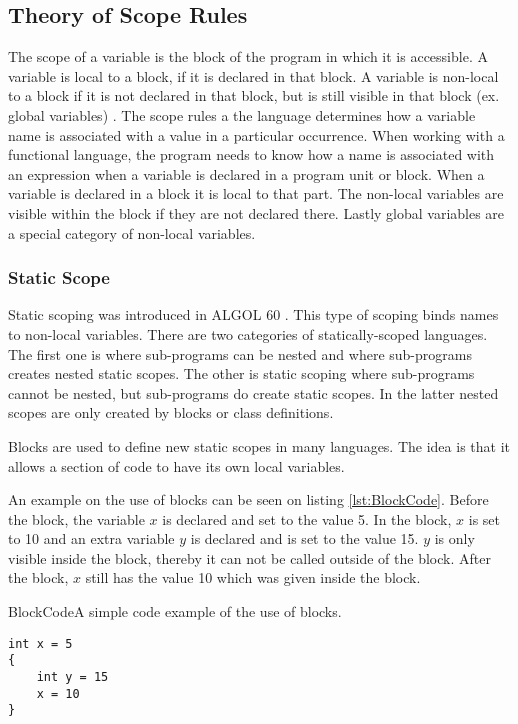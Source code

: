 \subsection{Theory of Scope Rules}
\label{sec:scoperules}
The scope of a variable is the block of the program in which it is accessible. A variable is local to a block, if it is declared in that block. A variable is non-local to a block if it is not declared in that block, but is still visible in that block (ex. global variables) \citep{sebesta}.
The scope rules a the language determines how a variable name is associated with a value in a particular occurrence. When working with a functional language, the program needs to know how a name is associated with an expression when a variable is declared in a program unit or block. When a variable is declared in a block it is local to that part. The non-local variables are visible within the block if they are not declared there. Lastly global variables are a special category of non-local variables.

\subsubsection{Static Scope}
Static scoping was introduced in ALGOL 60 \citep{sebesta}. This type of scoping binds names to non-local variables. There are two categories of statically-scoped languages. The first one is where sub-programs can be nested and where sub-programs creates nested static scopes. The other is static scoping where sub-programs cannot be nested, but sub-programs do create static scopes. In the latter nested scopes are only created by blocks or class definitions.

Blocks are used to define new static scopes in many languages. The idea is that it allows a section of code to have its own local variables.

An example on the use of blocks can be seen on listing \ref{lst:BlockCode}. Before the block, the variable $x$ is declared and set to the value 5. In the block, $x$ is set to 10 and an extra variable $y$ is declared and is set to the value 15. $y$ is only visible inside the block, thereby it can not be called outside of the block. After the block, $x$ still has the value 10 which was given inside the block.

\begin{code}{BlockCode}{A simple code example of the use of blocks.}
\begin{lstlisting}
int x = 5
{
    int y = 15
    x = 10
} 
\end{lstlisting}
\end{code}

